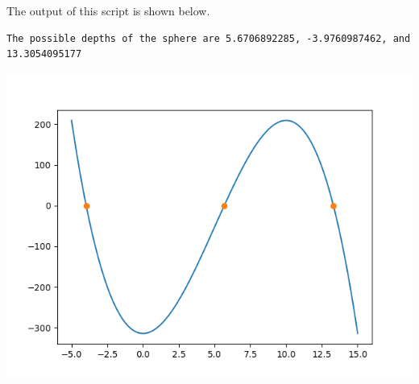 \documentclass[11pt, oneside]{article}
\begin{document}
\begin{enumerate}
    The output of this script is shown below.
    \begin{verbatim}
The possible depths of the sphere are 5.6706892285, -3.9760987462, and 13.3054095177
    \end{verbatim}
    \begin{center}
      \includegraphics[scale=1]{Figures/01_2.png}
    \end{center}
\end{enumerate}
\end{document}
